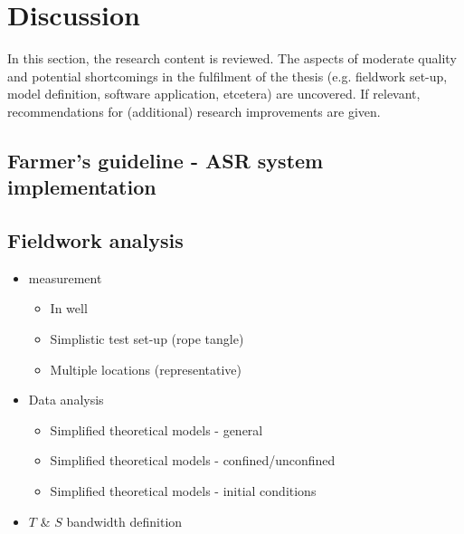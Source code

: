 \chapter{Discussion}
\label{chapter:discussion}
In this section, the research content is reviewed. The aspects of moderate quality and potential shortcomings in the fulfilment of the thesis (e.g. fieldwork set-up, model definition, software application, etcetera) are uncovered. If relevant, recommendations for (additional) research improvements are given. 

\section{Farmer's guideline - ASR system implementation} 
\label{sec:farmers_guide}

\section{Fieldwork analysis} 
\begin{itemize}
\item{measurement}
\begin{itemize}
\item{In well}
\item{Simplistic test set-up (rope tangle)}
\item{Multiple locations (representative)}
\end{itemize}
\item{Data analysis}
\begin{itemize}
\item{Simplified theoretical models - general}
\item{Simplified theoretical models - confined/unconfined }
\item{Simplified theoretical models - initial conditions}
\end{itemize}
\item{$T$ \& $S$ bandwidth definition}
\end{itemize}


